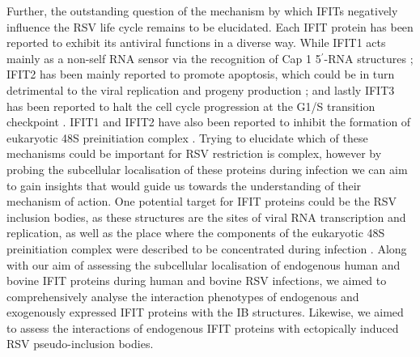 Further, the outstanding question of the mechanism by which IFITs negatively influence the RSV life cycle remains to be elucidated. Each IFIT protein has been reported to exhibit its antiviral functions in a diverse way. While IFIT1 acts mainly as a non-self RNA sensor via the recognition of Cap 1 5$^{\prime}$-RNA structures \cite{Mears2018BetterResponse}; IFIT2 has been mainly reported to promote apoptosis, which could be in turn detrimental to the viral replication and progeny production \cite{Chen2017InhibitionApoptosis}; and lastly IFIT3 has been reported to halt the cell cycle progression at the G1/S transition checkpoint \cite{Xiao2006RIG-GProteins}. IFIT1 and IFIT2 have also been reported to inhibit the formation of eukaryotic 48S preinitiation complex \cite{Diamond2014IFIT1:Translation, Guo2000CharacterizationVirus}. Trying to elucidate which of these mechanisms could be important for RSV restriction is complex, however by probing the subcellular localisation of these proteins during infection we can aim to gain insights that would guide us towards the understanding of their mechanism of action. One potential target for IFIT proteins could be the RSV inclusion bodies, as these structures are the sites of viral RNA transcription and replication, as well as the place where the components of the eukaryotic 48S preinitiation complex were described to be concentrated during infection \cite{Rincheval2017FunctionalVirus, Jobe2020RespiratorySignaling, Jobe2024ViralCondensates}. Along with our aim of assessing the subcellular localisation of endogenous human and bovine IFIT proteins during human and bovine RSV infections, we aimed to comprehensively analyse the interaction phenotypes of endogenous and exogenously expressed IFIT proteins with the IB structures. Likewise, we aimed to assess the interactions of endogenous IFIT proteins with ectopically induced RSV pseudo-inclusion bodies.


